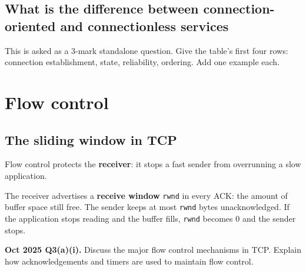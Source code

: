 \documentclass[11pt,a4paper]{article}
\begin{document}
\subsection{What is the difference between connection-oriented and connectionless services}

This is asked as a 3-mark standalone question. Give the table's first four rows: connection establishment, state, reliability, ordering. Add one example each.

\section{Flow control}

\subsection{The sliding window in TCP}

Flow control protects the \textbf{receiver}: it stops a fast sender from overrunning a slow application.

The receiver advertises a \textbf{receive window} \texttt{rwnd} in every ACK: the amount of buffer space still free. The sender keeps at most \texttt{rwnd} bytes unacknowledged. If the application stops reading and the buffer fills, \texttt{rwnd} becomes 0 and the sender stops.

\begin{pyqbox}
\textbf{Oct 2025 Q3(a)(i).} Discuss the major flow control mechanisms in TCP. Explain how acknowledgements and timers are used to maintain flow control.
\end{pyqbox}
\end{document}
